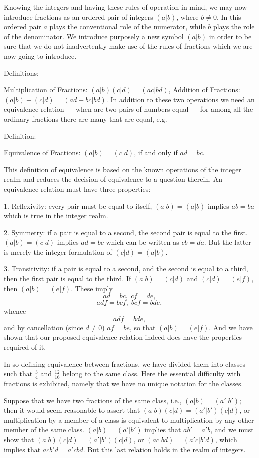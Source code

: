 \documentclass[a4paper]{article}
\begin{document}
Knowing the integers and having these rules of operation in mind, we may now introduce fractions as an ordered pair of
integers $(a|b)$, where $b \neq 0$. In this ordered pair $a$ plays the conventional role of the numerator, while $b$ plays the
role of the denominator. We introduce purposely a new symbol $(a|b)$ in order to be sure that we do not inadvertently make use
of the rules of fractions which we are now going to introduce.

Definitions:

Multiplication of Fractions: $(a|b)(c|d)=(ac|bd)$, Addition of Fractions: $(a|b)+(c|d)=(ad+bc|bd)$. In addition to these two
operations we need an equivalence relation --- when are two pairs of numbers equal --- for among all the ordinary fractions
there are many that are equal, e.g.

Definition:

Equivalence of Fractions: $(a|b)=(c|d)$, if and only if $ad=bc$.

This definition of equivalence is based on the known operations of the integer realm and reduces the decision of equivalence
to a question therein. An equivalence relation must have three properties:

1. Reflexivity: every pair must be equal to itself, $(a|b)=(a|b)$ implies $ab=ba$ which is true in the integer realm.

2. Symmetry: if a pair is equal to a second, the second pair is equal to the first. $(a|b)=(c|d)$ implies $ad=bc$ which
can be written as $cb=da$. But the latter is merely the integer formulation of $(c|d)=(a|b)$.

3. Transitivity: if a pair is equal to a second, and the second is equal to a third, then the first pair is equal to the
third. If $(a|b)=(c|d)$ and $(c|d)=(e|f)$, then $(a|b)=(e|f)$. These imply
$$ad=bc, \; cf=de,$$
$$adf=bcf, \; bcf=bde,$$
whence
$$adf=bde,$$
and by cancellation (since $d \neq 0$) $af=be$, so that $(a|b)=(e|f)$. And we have shown that our proposed equivalence relation
indeed does have the properties required of it.

In so defining equivalence between fractions, we have divided them into classes such that $\frac{3}{4}$ and $\frac{12}{16}$
belong to the same class. Here the essential difficulty with fractions is exhibited, namely that we have no unique notation
for the classes.

Suppose that we have two fractions of the same class, i.e., $(a|b)=(a'|b')$; then it would seem reasonable to assert that
$(a|b)(c|d)=(a'|b')(c|d)$, or multiplication by a member of a class is equivalent to multiplication by any other member of the
same class. $(a|b)=(a'|b')$ implies that $ab'=a'b$, and we must show that $(a|b)(c|d)=(a'|b')(c|d)$, or
$(ac|bd)=(a'c|b'd)$, which implies that $acb'd=a'cbd$. But this last relation holds in the realm of integers.
\end{document}
